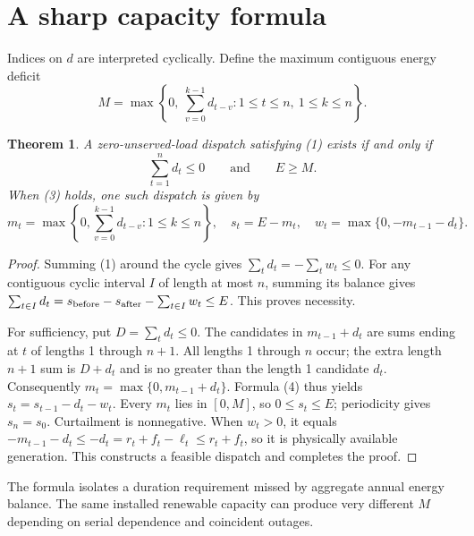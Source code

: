 \documentclass[11pt]{article}
\newtheorem{theorem}{Theorem}
\begin{document}
\section{A sharp capacity formula}
Indices on $d$ are interpreted cyclically. Define the maximum contiguous
energy deficit
\[
 M=\max\left\{0,\ \sum_{v=0}^{k-1}d_{t-v}:
                   1\leq t\leq n,\ 1\leq k\leq n\right\}.    \tag{2}
\]
\begin{theorem}\label{adequacy}
A zero-unserved-load dispatch satisfying (1) exists if and only if
\[
 \sum_{t=1}^n d_t\leq0\qquad\text{and}\qquad E\geq M.          \tag{3}
\]
When (3) holds, one such dispatch is given by
\[
 m_t=\max\left\{0,\sum_{v=0}^{k-1}d_{t-v}:1\leq k\leq n\right\},
 \quad s_t=E-m_t,\quad w_t=\max\{0,-m_{t-1}-d_t\}.             \tag{4}
\]
\end{theorem}
\begin{proof}
Summing (1) around the cycle gives $\sum_td_t=-\sum_tw_t\leq0$.
For any contiguous cyclic interval $I$ of length at most $n$, summing
its balance gives $\sum_{t\in I}d_t=s_{\rm before}-s_{\rm after}
-\sum_{t\in I}w_t\leq E$. This proves necessity.

For sufficiency, put $D=\sum_td_t\leq0$. The candidates in
$m_{t-1}+d_t$ are sums ending at $t$ of lengths 1 through $n+1$.
All lengths 1 through $n$ occur; the extra length $n+1$ sum is $D+d_t$
and is no greater than the length 1 candidate $d_t$.
Consequently $m_t=\max\{0,m_{t-1}+d_t\}$. Formula (4) thus yields
$s_t=s_{t-1}-d_t-w_t$. Every $m_t$ lies in $[0,M]$, so
$0\leq s_t\leq E$; periodicity gives $s_n=s_0$. Curtailment is nonnegative.
When $w_t>0$, it equals $-m_{t-1}-d_t\leq-d_t
=r_t+f_t-\ell_t\leq r_t+f_t$, so it is physically available generation.
This constructs a feasible dispatch and completes the proof.
\end{proof}
The formula isolates a duration requirement missed by aggregate annual
energy balance. The same installed renewable capacity can produce very
different $M$ depending on serial dependence and coincident outages.
\end{document}
